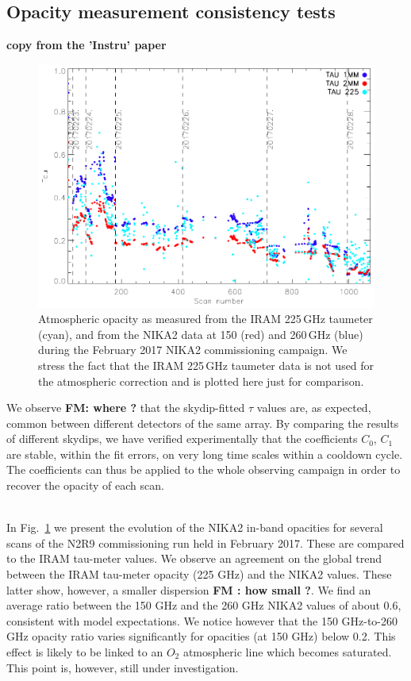 \subsection{Opacity measurement consistency tests}

{\bf copy from the 'Instru' paper}

\begin{figure}
\includegraphics[scale=0.75]{../../Paper_NIKA2_Technical/opacity_evol_run22.pdf}
\caption{Atmospheric opacity as measured from the IRAM 225\,GHz taumeter (cyan), and from the NIKA2 data at 150 (red) and 260\,GHz (blue) during the February 2017 NIKA2 commissioning campaign. We stress the fact that the IRAM 225\,GHz taumeter data is not used for the atmospheric correction and is plotted here just for comparison.
  \label{fig:taumeas}}
\end{figure}

We observe {\bf FM: where ?} that the skydip-fitted $\tau$ values are, as expected,
common between different detectors of the same array. By comparing
the results of different skydips, we have verified experimentally
that the coefficients $C_0$, $C_1$ are stable, within the fit
errors, on very long time scales within a cooldown cycle. The
coefficients can thus be applied to the whole observing campaign
in order to recover the opacity of each scan.


\\


In Fig.~\ref{fig:taumeas} we present the evolution of the NIKA2 in-band opacities for several
scans of the N2R9 commissioning run held in February 2017. These are
compared to the IRAM tau-meter values. We observe an agreement on the global trend between the IRAM tau-meter opacity
(225 GHz) and the NIKA2 values. These latter show, however,
a smaller dispersion {\bf FM : how small ?}. We find an average ratio between the
150 GHz and the 260 GHz NIKA2 values of about
0.6, consistent with model expectations. We notice however that
the 150 GHz-to-260 GHz opacity ratio varies significantly for
opacities (at 150 GHz) below 0.2. This effect is likely to be
linked to an $O_2$ atmospheric line which becomes saturated. This
point is, however, still under investigation.

